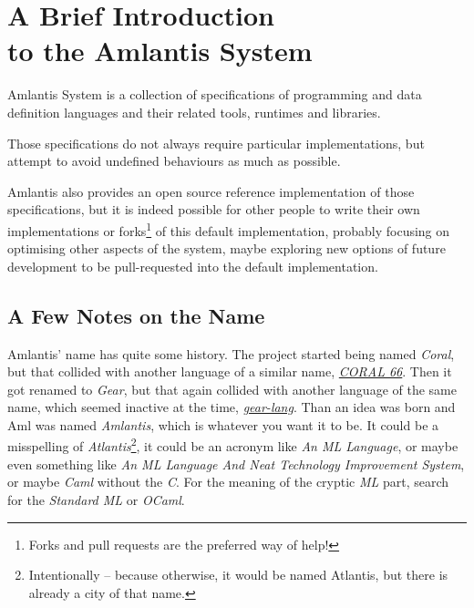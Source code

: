 
\chapter[A Brief Introduction to the Amlantis System]{A Brief Introduction \\ to the Amlantis System}
\label{sec:brief-intro}

Amlantis System is a collection of specifications of programming and data definition languages and their related tools, runtimes and libraries. 

Those specifications do not always require particular implementations, but attempt to avoid undefined behaviours as much as possible. 

Amlantis also provides an open source reference implementation of those specifications, but it is indeed possible for other people to write their own implementations or forks\footnote{Forks and pull requests are the preferred way of help!} of this default implementation, probably focusing on optimising other aspects of the system, maybe exploring new options of future development to be pull-requested into the default implementation. 





\section*{A Few Notes on the Name}

Amlantis' name has quite some history. The project started being named {\em Coral}, but that collided with another language of a similar name, \href{https://en.wikipedia.org/wiki/Coral_66}{{\em CORAL 66}}. Then it got renamed to {\em Gear}, but that again collided with another language of the same name, which seemed inactive at the time, \href{https://github.com/gear-lang}{{\em gear-lang}}. Than an idea was born and Aml was named {\em Amlantis}, which is whatever you want it to be. It could be a misspelling of {\em Atlantis}\footnote{Intentionally -- because otherwise, it would be named Atlantis, but there is already a city of that name.}, it could be an acronym like {\em An ML Language}, or maybe even something like {\em An ML Language And Neat Technology Improvement System}, or maybe {\em Caml} without the {\em C}. For the meaning of the cryptic {\em ML} part, search for the {\em Standard ML} or {\em OCaml}. 





